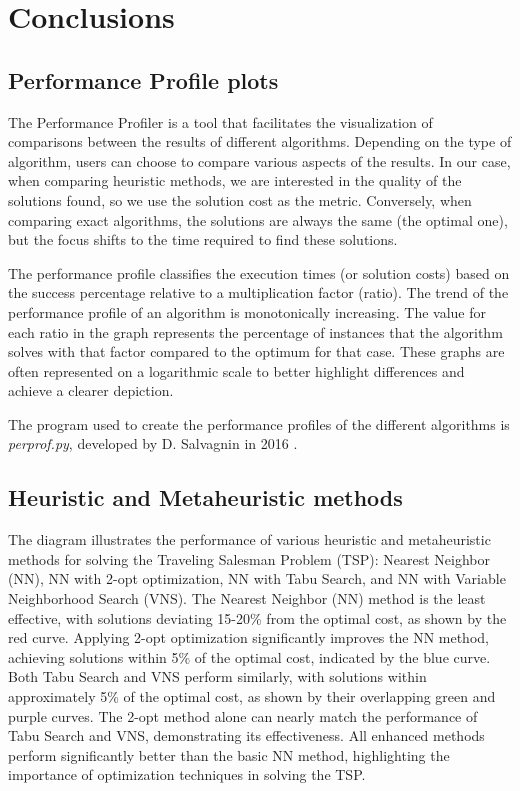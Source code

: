 \chapter{Conclusions}

\section{Performance Profile plots}
The Performance Profiler \cite{dolan2002benchmarking} is a tool that facilitates the visualization of comparisons between the results of different algorithms. Depending on the type of algorithm, users can choose to compare various aspects of the results. In our case, when comparing heuristic methods, we are interested in the quality of the solutions found, so we use the solution cost as the metric. Conversely, when comparing exact algorithms, the solutions are always the same (the optimal one), but the focus shifts to the time required to find these solutions.

The performance profile classifies the execution times (or solution costs) based on the success percentage relative to a multiplication factor (ratio). The trend of the performance profile of an algorithm is monotonically increasing. The value for each ratio in the graph represents the percentage of instances that the algorithm solves with that factor compared to the optimum for that case. These graphs are often represented on a logarithmic scale to better highlight differences and achieve a clearer depiction.

The program used to create the performance profiles of the different algorithms is \textit{perprof.py}, developed by D. Salvagnin in 2016 \cite{salvagnin2016performance}.

\section{Heuristic and Metaheuristic methods}
The diagram illustrates the performance of various heuristic and metaheuristic methods for solving the Traveling Salesman Problem (TSP): Nearest Neighbor (NN), NN with 2-opt optimization, NN with Tabu Search, and NN with Variable Neighborhood Search (VNS). The Nearest Neighbor (NN) method is the least effective, with solutions deviating 15-20\% from the optimal cost, as shown by the red curve. Applying 2-opt optimization significantly improves the NN method, achieving solutions within 5\% of the optimal cost, indicated by the blue curve. Both Tabu Search and VNS perform similarly, with solutions within approximately 5\% of the optimal cost, as shown by their overlapping green and purple curves. The 2-opt method alone can nearly match the performance of Tabu Search and VNS, demonstrating its effectiveness. All enhanced methods perform significantly better than the basic NN method, highlighting the importance of optimization techniques in solving the TSP.

